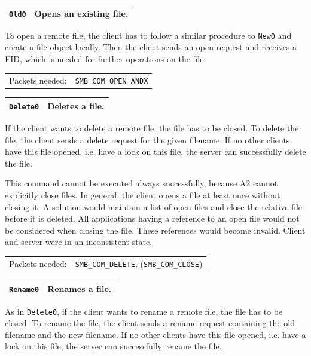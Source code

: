 \documentclass[11pt,a4paper]{book}
\begin{document}
\begin{center}
\renewcommand{\tabcolsep}{5mm}
\begin{tabular}{p{3cm}p{8cm}}
\texttt{Old0} & \textbf{Opens an existing file.} \\ 
\hline
\end{tabular}
\end{center}
To open a remote file, the client has to follow a similar procedure to \texttt{New0} and create a file object locally. Then the client sends an open request and receives a FID, which is needed for further operations on the file. \\
\renewcommand{\tabcolsep}{5mm}
\begin{tabular}{p{3cm}p{8cm}}
Packets needed: & \texttt{SMB\_COM\_OPEN\_ANDX} \\
\end{tabular}

\begin{center}
\renewcommand{\tabcolsep}{5mm}
\begin{tabular}{p{3cm}p{8cm}}
\texttt{Delete0} & \textbf{Deletes a file.} \\ 
\hline
\end{tabular}
\end{center}
If the client wants to delete a remote file, the file has to be closed. To delete the file, the client sends a delete request for the given filename. If no other clients have this file opened, i.e. have a lock on this file, the server can successfully delete the file.

This command cannot be executed always successfully, because A2 cannot explicitly close files. In general, the client opens a file at least once without closing it. A solution would maintain a list of open files and close the relative file before it is deleted. All applications having a reference to an open file would not be considered when closing the file. These references would become invalid. Client and server were in an inconsistent state. \\
\renewcommand{\tabcolsep}{5mm}
\begin{tabular}{p{3cm}p{8cm}}
Packets needed: & \texttt{SMB\_COM\_DELETE}, (\texttt{SMB\_COM\_CLOSE}) \\
\end{tabular}

\begin{center}
\renewcommand{\tabcolsep}{5mm}
\begin{tabular}{p{3cm}p{8cm}}
\texttt{Rename0} & \textbf{Renames a file.} \\ 
\hline
\end{tabular}
\end{center}
As in \texttt{Delete0}, if the client wants to rename a remote file, the file has to be closed. To rename the file, the client sends a rename request containing the old filename and the new filename. If no other clients have this file opened, i.e. have a lock on this file, the server can successfully rename the file.
\end{document}
